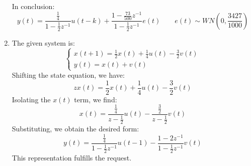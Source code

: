 \begin{enumerate}
        In conclusion:
        \[y(t)=\dfrac{\frac{1}{4}}{1-\frac{1}{2}z^{-1}}u(t-k)+\dfrac{1-\frac{73}{500}z^{-1}}{1-\frac{1}{2}z^{-1}}e(t) \qquad e(t)\sim WN\left(0,\frac{3427}{1000}\right)\]
    \item The given system is:
        \[\begin{cases}
            x(t+1)=\frac{1}{2}x(t)+\frac{1}{4}u(t)-\frac{3}{2}v(t) \\
            y(t)=x(t)+v(t)
        \end{cases}\]
        Shifting the state equation, we have:
        \[zx(t)=\frac{1}{2}x(t)+\frac{1}{4}u(t)-\frac{3}{2}v(t)\]
        Isolating the $x(t)$ term, we find:
        \[x(t)=\dfrac{\frac{1}{4}}{z-\frac{1}{2}}u(t)-\dfrac{\frac{3}{2}}{z-\frac{1}{2}}v(t)\]
        Substituting, we obtain the desired form:
        \[y(t)=\dfrac{\frac{1}{4}}{1-\frac{1}{2}z^{-1}}u(t-1)-\dfrac{1-2z^{-1}}{1-\frac{1}{2}z^{-1}}v(t)\]
        This representation fulfills the request.


\end{enumerate}
